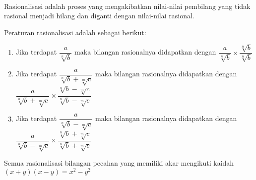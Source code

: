 \paragraph*{}
	Rasionalisasi adalah proses yang mengakibatkan nilai-nilai pembilang yang tidak rasional menjadi hilang dan diganti dengan nilai-nilai rasional.\par
	Peraturan rasionalisasi adalah sebagai berikut:
	\begin{enumerate}
		\item Jika terdapat $\dfrac{a}{\sqrt[n]{b}}$ maka bilangan rasionalnya didapatkan dengan $\dfrac{a}{\sqrt[n]{b}}\times \dfrac{\sqrt[n]{b}}{\sqrt[n]{b}}$
		\item Jika terdapat $\dfrac{a}{\sqrt[n]{b}+\sqrt[m]{c}}$ maka bilangan rasionalnya didapatkan dengan \\ $\dfrac{a}{\sqrt[n]{b}+\sqrt[m]{c}} \times\dfrac{\sqrt[n]{b}-\sqrt[m]{c}}{\sqrt[n]{b}-\sqrt[m]{c}} $
		\item Jika terdapat $\dfrac{a}{\sqrt[n]{b}-\sqrt[m]{c}}$ maka bilangan rasionalnya didapatkan dengan \\ $\dfrac{a}{\sqrt[n]{b}-\sqrt[m]{c}} \times\dfrac{\sqrt[n]{b}+\sqrt[m]{c}}{\sqrt[n]{b}+\sqrt[m]{c}} $
	\end{enumerate}
	Semua rasionalisasi bilangan pecahan yang memiliki akar mengikuti kaidah $(x+y)(x-y)=x^2-y^2$
